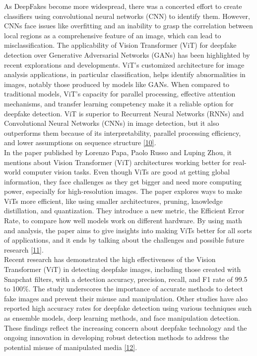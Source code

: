 \noindent As DeepFakes become more widespread, there was a concerted effort to create classifiers using convolutional neural networks (CNN) to identify them. However, CNNs face issues like overfitting and an inability to grasp the correlation between local regions as a comprehensive feature of an image, which can lead to misclassification. The applicability of Vision Transformer (ViT) for deepfake detection over Generative Adversarial Networks (GANs) has been highlighted by recent explorations and developments. ViT's customized architecture for image analysis applications, in particular classification, helps identify abnormalities in images, notably those produced by models like GANs. When compared to traditional models, ViT's capacity for parallel processing, effective attention mechanisms, and transfer learning competency make it a reliable option for deepfake detection. ViT is superior to Recurrent Neural Networks (RNNs) and Convolutional Neural Networks (CNNs) in image detection, but it also outperforms them because of its interpretability, parallel processing efficiency, and lower assumptions on sequence structure \hyperref[ref10]{[10]}.\\

\noindent In the paper published by Lorenzo Papa, Paolo Russo and Luping Zhou, it mentions about Vision Transformer (ViT) architectures working better for real-world computer vision tasks. Even though ViTs are good at getting global information, they face challenges as they get bigger and need more computing power, especially for high-resolution images. The paper explores ways to make ViTs more efficient, like using smaller architectures, pruning, knowledge distillation, and quantization. They introduce a new metric, the Efficient Error Rate, to compare how well models work on different hardware. By using math and analysis, the paper aims to give insights into making ViTs better for all sorts of applications, and it ends by talking about the challenges and possible future research \hyperref[ref11]{[11]}.\\

\noindent Recent research has demonstrated the high effectiveness of the Vision Transformer (ViT) in detecting deepfake images, including those created with Snapchat filters, with a detection accuracy, precision, recall, and F1 rate of 99.5 to 100\%. The study underscores the importance of accurate methods to detect fake images and prevent their misuse and manipulation. Other studies have also reported high accuracy rates for deepfake detection using various techniques such as ensemble models, deep learning methods, and face manipulation detection. These findings reflect the increasing concern about deepfake technology and the ongoing innovation in developing robust detection methods to address the potential misuse of manipulated media \hyperref[ref12]{[12]}.\\

